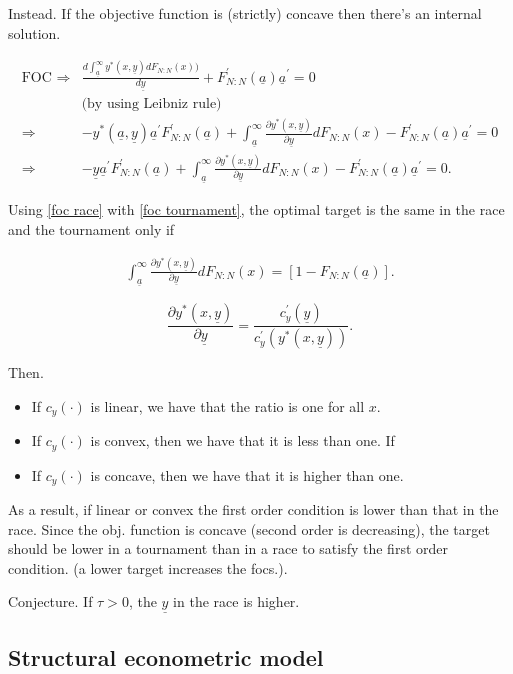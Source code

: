 \documentclass[12pt,]{article}
\newcommand\target{\underline{y}}
\newcommand\mtype{\underline{a}}
\newcommand\dystar{\frac{\partial y^*(x,\target)}{\partial\target}dF_{N:N}(x)}
\begin{document}
Instead. If the objective function is (strictly) concave then there's an
internal solution.

\begin{align} \label{foc tournament}
  \text{FOC } \Rightarrow & 
    \frac{d\int_{\mtype}^\infty y^*(x, \target) d F_{N:N}(x)) }{d \target}
      + F^\prime_{N:N}(\mtype) \mtype^\prime =0 \nonumber\\ 
    & \text{(by using Leibniz rule)}\nonumber\\
  \Rightarrow & - y^*(\mtype, \target) \mtype^\prime F^\prime_{N:N}(\mtype) 
      + \int_{\mtype}^\infty \dystar - F^\prime_{N:N}(\mtype) \mtype^\prime = 0\nonumber\\
  \Rightarrow & -\target \mtype^\prime F^\prime_{N:N}(\mtype) 
      + \int_{\mtype}^\infty \dystar - F^\prime_{N:N}(\mtype) \mtype^\prime = 0.
\end{align}

Using \eqref{foc race} with \eqref{foc tournament}, the optimal target
is the same in the race and the tournament only if

\begin{align} 
  \int_{\mtype}^\infty \dystar = [1- F_{N:N}(\mtype)].
\end{align}

\[
  \frac{\partial y^*(x, \target)}{\partial \target} = 
    \frac{c_y^\prime(\target)}{c_y^\prime(y^*(x, \target))}. 
\]

Then.

\begin{itemize}
\item
  If \(c_y(\cdot)\) is linear, we have that the ratio is one for all
  \(x\).
\item
  If \(c_y(\cdot)\) is convex, then we have that it is less than one. If
\item
  If \(c_y(\cdot)\) is concave, then we have that it is higher than one.
\end{itemize}

As a result, if linear or convex the first order condition is lower than
that in the race. Since the obj. function is concave (second order is
decreasing), the target should be lower in a tournament than in a race
to satisfy the first order condition. (a lower target increases the
focs.).

Conjecture. If \(\tau>0\), the \(\target\) in the race is higher.

\subsection{Structural econometric
model}\label{structural-econometric-model}
\end{document}
